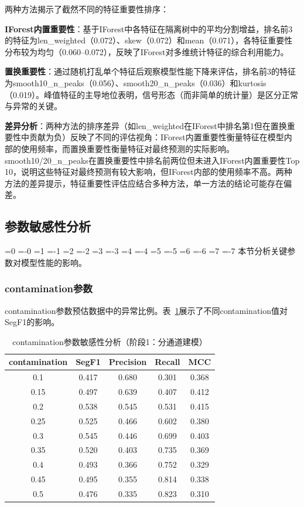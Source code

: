\documentclass[12pt, a4paper]{article}
\newcommand{\zihao}[1]{%
    \ifnum#1=0 {\fontsize{42pt}{50pt}\selectfont}%
    \else\ifnum#1=-0 {\fontsize{36pt}{44pt}\selectfont}%
    \else\ifnum#1=1 {\fontsize{26pt}{32pt}\selectfont}%
    \else\ifnum#1=-1 {\fontsize{24pt}{28pt}\selectfont}%
    \else\ifnum#1=2 {\fontsize{22pt}{26pt}\selectfont}%
    \else\ifnum#1=-2 {\fontsize{18pt}{22pt}\selectfont}%
    \else\ifnum#1=3 {\fontsize{16pt}{20pt}\selectfont}%
    \else\ifnum#1=-3 {\fontsize{15pt}{18pt}\selectfont}%
    \else\ifnum#1=4 {\fontsize{14pt}{17pt}\selectfont}%
    \else\ifnum#1=-4 {\fontsize{12pt}{15pt}\selectfont}%
    \else\ifnum#1=5 {\fontsize{10.5pt}{13pt}\selectfont}%
    \else\ifnum#1=-5 {\fontsize{9pt}{11pt}\selectfont}%
    \else\ifnum#1=6 {\fontsize{7.5pt}{9pt}\selectfont}%
    \else\ifnum#1=-6 {\fontsize{6.5pt}{8pt}\selectfont}%
    \else\ifnum#1=7 {\fontsize{5.5pt}{7pt}\selectfont}%
    \else\ifnum#1=-7 {\fontsize{5pt}{6pt}\selectfont}%
    \fi\fi\fi\fi\fi\fi\fi\fi\fi\fi\fi\fi\fi\fi\fi\fi
}
\newcommand{\songti}{\CJKfontspec{SimSun}}
\begin{document}
两种方法揭示了截然不同的特征重要性排序：

\textbf{IForest内置重要性}：基于IForest中各特征在隔离树中的平均分割增益，排名前3的特征为len\_weighted（0.072）、skew（0.072）和mean（0.071），各特征重要性分布较为均匀（0.060--0.072），反映了IForest对多维统计特征的综合利用能力。

\textbf{置换重要性}：通过随机打乱单个特征后观察模型性能下降来评估，排名前3的特征为smooth10\_n\_peaks（0.056）、smooth20\_n\_peaks（0.036）和kurtosis（0.019）。峰值特征的主导地位表明，信号形态（而非简单的统计量）是区分正常与异常的关键。

\textbf{差异分析}：两种方法的排序差异（如len\_weighted在IForest中排名第1但在置换重要性中贡献为负）反映了不同的评估视角：IForest内置重要性衡量特征在模型内部的使用频率，而置换重要性衡量特征对最终预测的实际影响。smooth10/20\_n\_peaks在置换重要性中排名前两位但未进入IForest内置重要性Top 10，说明这些特征对最终预测有较大影响，但IForest内部的使用频率不高。两种方法的差异提示，特征重要性评估应结合多种方法，单一方法的结论可能存在偏差。

\subsection{参数敏感性分析}

\zihao{5}\songti
本节分析关键参数对模型性能的影响。

\subsubsection{contamination参数}

contamination参数预估数据中的异常比例。表~\ref{tab:contamination}展示了不同contamination值对SegF1的影响。

\begin{table}[H]
\centering
\caption{contamination参数敏感性分析（阶段1：分通道建模）}
\label{tab:contamination}
\begin{tabular}{ccccc}
\toprule
contamination & SegF1 & Precision & Recall & MCC \\
\midrule
0.1 & 0.417 & 0.680 & 0.301 & 0.368 \\
0.15 & 0.497 & 0.639 & 0.407 & 0.412 \\
0.2 & 0.538 & 0.545 & 0.531 & 0.415 \\
0.25 & 0.525 & 0.466 & 0.602 & 0.380 \\
0.3 & 0.545 & 0.446 & 0.699 & 0.403 \\
0.35 & 0.520 & 0.403 & 0.735 & 0.369 \\
0.4 & 0.493 & 0.366 & 0.752 & 0.329 \\
0.45 & 0.495 & 0.355 & 0.814 & 0.338 \\
0.5 & 0.476 & 0.335 & 0.823 & 0.310 \\
\bottomrule
\end{tabular}
\end{table}
\end{document}
